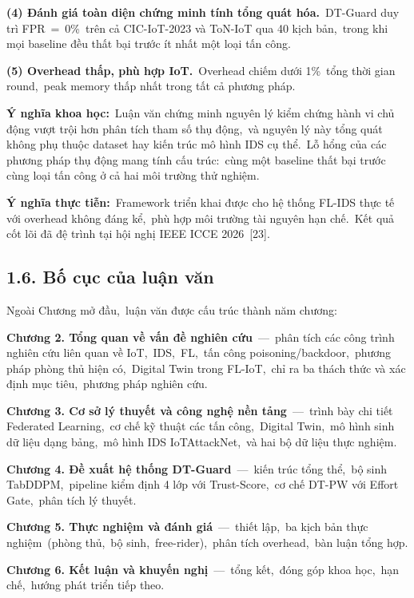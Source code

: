 \textbf{(4) Đánh giá toàn diện chứng minh tính tổng quát hóa.}~DT-Guard duy trì FPR~=~0\%~trên cả CIC-IoT-2023 và ToN-IoT qua 40 kịch bản,~trong khi mọi baseline đều thất bại trước ít nhất một loại tấn công.

\textbf{(5) Overhead thấp, phù hợp IoT.}~Overhead chiếm dưới 1\%~tổng thời gian round,~peak memory thấp nhất trong tất cả phương pháp.

\textbf{Ý nghĩa khoa học:}~Luận văn chứng minh nguyên lý kiểm chứng hành vi chủ động vượt trội hơn phân tích tham số thụ động,~và nguyên lý này tổng quát không phụ thuộc dataset hay kiến trúc mô hình IDS cụ thể.~Lỗ hổng của các phương pháp thụ động mang tính cấu trúc:~cùng một baseline thất bại trước cùng loại tấn công ở cả hai môi trường thử nghiệm.

\textbf{Ý nghĩa thực tiễn:}~Framework triển khai được cho hệ thống FL-IDS thực tế với overhead không đáng kể,~phù hợp môi trường tài nguyên hạn chế.~Kết quả cốt lõi đã đệ trình tại hội nghị IEEE ICCE 2026~{[}23{]}.

\subsection{1.6. Bố cục của luận văn}\label{bux1ed1-cux1ee5c-cux1ee7a-luux1eadn-vux103n}

Ngoài Chương mở đầu,~luận văn được cấu trúc thành năm chương:

\textbf{Chương 2. Tổng quan về vấn đề nghiên cứu}~---~phân tích các công trình nghiên cứu liên quan về IoT,~IDS,~FL,~tấn công poisoning/backdoor,~phương pháp phòng thủ hiện có,~Digital Twin trong FL-IoT,~chỉ ra ba thách thức và xác định mục tiêu,~phương pháp nghiên cứu.

\textbf{Chương 3. Cơ sở lý thuyết và công nghệ nền tảng}~---~trình bày chi tiết Federated Learning,~cơ chế kỹ thuật các tấn công,~Digital Twin,~mô hình sinh dữ liệu dạng bảng,~mô hình IDS IoTAttackNet,~và hai bộ dữ liệu thực nghiệm.

\textbf{Chương 4. Đề xuất hệ thống DT-Guard}~---~kiến trúc tổng thể,~bộ sinh TabDDPM,~pipeline kiểm định 4 lớp với Trust-Score,~cơ chế DT-PW với Effort Gate,~phân tích lý thuyết.

\textbf{Chương 5. Thực nghiệm và đánh giá}~---~thiết lập,~ba kịch bản thực nghiệm~(phòng thủ,~bộ sinh,~free-rider),~phân tích overhead,~bàn luận tổng hợp.

\textbf{Chương 6. Kết luận và khuyến nghị}~---~tổng kết,~đóng góp khoa học,~hạn chế,~hướng phát triển tiếp theo.

